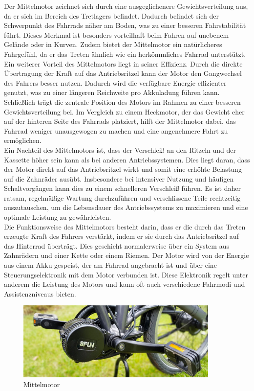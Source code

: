 Der Mittelmotor zeichnet sich durch eine ausgeglichenere Gewichtsverteilung aus, da er sich im Bereich des Tretlagers befindet.
Dadurch befindet sich der Schwerpunkt des Fahrrads näher am Boden, was zu einer besseren Fahrstabilität führt.
Dieses Merkmal ist besonders vorteilhaft beim Fahren auf unebenem Gelände oder in Kurven.
Zudem bietet der Mittelmotor ein natürlicheres Fahrgefühl, da er das Treten ähnlich wie ein herkömmliches Fahrrad unterstützt.\\

Ein weiterer Vorteil des Mittelmotors liegt in seiner Effizienz.
Durch die direkte Übertragung der Kraft auf das Antriebsritzel kann der Motor den Gangwechsel des Fahrers besser nutzen.
Dadurch wird die verfügbare Energie effizienter genutzt, was zu einer längeren Reichweite pro Akkuladung führen kann.
Schließlich trägt die zentrale Position des Motors im Rahmen zu einer besseren Gewichtsverteilung bei.
Im Vergleich zu einem Heckmotor, der das Gewicht eher auf der hinteren Seite des Fahrrads platziert, hilft der Mittelmotor dabei, das Fahrrad weniger unausgewogen zu machen und eine angenehmere Fahrt zu ermöglichen.\\

Ein Nachteil des Mittelmotors ist, dass der Verschleiß an den Ritzeln und der Kassette höher sein kann als bei anderen Antriebssystemen.
Dies liegt daran, dass der Motor direkt auf das Antriebsritzel wirkt und somit eine erhöhte Belastung auf die Zahnräder ausübt.
Insbesondere bei intensiver Nutzung und häufigen Schaltvorgängen kann dies zu einem schnelleren Verschleiß führen.
Es ist daher ratsam, regelmäßige Wartung durchzuführen und verschlissene Teile rechtzeitig auszutauschen, um die Lebensdauer des Antriebssystems zu maximieren und eine optimale Leistung zu gewährleisten.\\

Die Funktionsweise des Mittelmotors besteht darin, dass er die durch das Treten erzeugte Kraft des Fahrers verstärkt, indem er sie durch das Antriebsritzel auf das Hinterrad überträgt.
Dies geschieht normalerweise über ein System aus Zahnrädern und einer Kette oder einem Riemen.
Der Motor wird von der Energie aus einem Akku gespeist, der am Fahrrad angebracht ist und über eine Steuerungselektronik mit dem Motor verbunden ist.
Diese Elektronik regelt unter anderem die Leistung des Motors und kann oft auch verschiedene Fahrmodi und Assistenzniveaus bieten.

\begin{figure}[h]
    \centering
    \includegraphics[width=10cm]{images/Mittelmotor-Fahrrad-nachruesten_F01.jpg}
    \caption{Mittelmotor\cite{noauthor_mittelmotor_nodate}}%
    \label{fig:8}
\end{figure}

